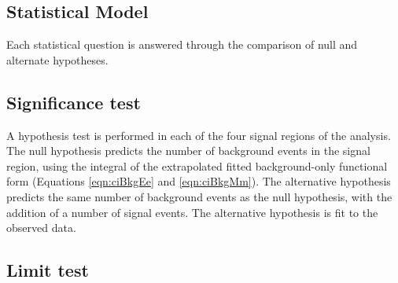\subsection{Statistical Model}

Each statistical question is answered through the comparison of null and alternate hypotheses.


\subsection{Significance test}\label{sec:ciSigTest}

A hypothesis test is performed in each of the four signal regions of the analysis.
The null hypothesis predicts the number of background events in the signal region, using the integral of the extrapolated fitted background-only functional form (Equations \ref{eqn:ciBkgEe} and \ref{eqn:ciBkgMm}).
The alternative hypothesis predicts the same number of background events as the null hypothesis, with the addition of a number of signal events.
The alternative hypothesis is fit to the observed data.


\subsection{Limit test}\label{sec:ciLimitSetting}
